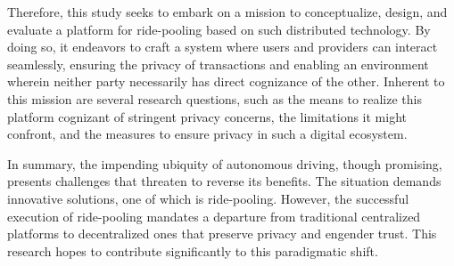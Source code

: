 Therefore, this study seeks to embark on a mission to conceptualize, design, and evaluate a platform for ride-pooling based on such distributed technology. By doing so, it endeavors to craft a system where users and providers can interact seamlessly, ensuring the privacy of transactions and enabling an environment wherein neither party necessarily has direct cognizance of the other. Inherent to this mission are several research questions, such as the means to realize this platform cognizant of stringent privacy concerns, the limitations it might confront, and the measures to ensure privacy in such a digital ecosystem.

In summary, the impending ubiquity of autonomous driving, though promising, presents challenges that threaten to reverse its benefits. The situation demands innovative solutions, one of which is ride-pooling. However, the successful execution of ride-pooling mandates a departure from traditional centralized platforms to decentralized ones that preserve privacy and engender trust. This research hopes to contribute significantly to this paradigmatic shift.




